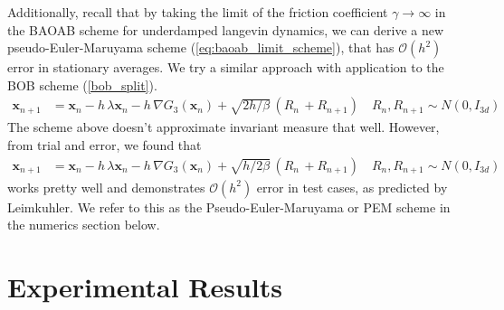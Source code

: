 \documentclass[11pt, twoside]{report}
\renewcommand{\vec}[1]{{\mathbf{#1}}}
\begin{document}
Additionally, recall that by taking the limit of the friction coefficient $\gamma \to \infty$ in the BAOAB scheme for underdamped langevin dynamics, we can derive a new pseudo-Euler-Maruyama scheme (\ref{eq:baoab_limit_scheme}), that has $\mathcal{O}(h^2)$ error in stationary averages\cite{leimkuhler2013rational}. We try a similar approach with application to the BOB scheme (\ref{bob_split}).
\begin{equation} 
\begin{split} 
\vec x_{n+1}&=\vec x_{n} - h \,\lambda \vec x_{n} - h\,\nabla G_{3}(\vec x_n) +\sqrt{2h/\beta} \, (R_n\, + R_{n+1}) \quad R_n, R_{n+1} \sim N(0,I_{3d})
\label{pseudo-euler}
\end{split}
\end{equation}
The scheme above doesn't approximate invariant measure that well. However, from trial and error, we found that
\begin{equation}
\begin{aligned}
\vec x_{n+1}&=\vec x_{n} - h \,\lambda \vec x_{n} - h\,\nabla G_{3}(\vec x_n) +\sqrt{h/2\beta} \, (R_n\, + R_{n+1}) \quad R_n, R_{n+1} \sim N(0,I_{3d})
\end{aligned}
\end{equation}
works pretty well and demonstrates $\mathcal{O}(h^2)$ error in test cases, as predicted by Leimkuhler. We refer to this as the Pseudo-Euler-Maruyama or PEM scheme in the numerics section below.

\chapter{Experimental Results}
\end{document}

